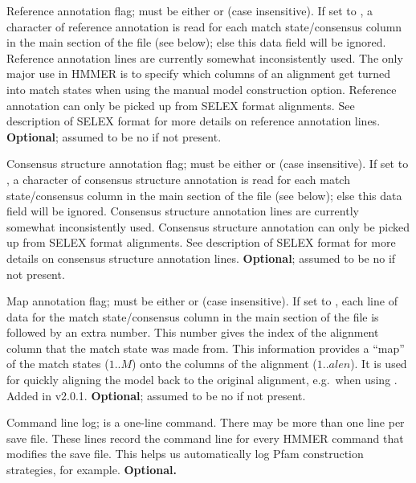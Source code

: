 \begin{wideitem}
\item [\emprog{RF    <s>}] Reference annotation flag;  must
be either  or  (case insensitive). If set to
, a character of reference annotation is read for each match
state/consensus column in the main section of the file (see below);
else this data field will be ignored.  Reference annotation lines are
currently somewhat inconsistently used. The only major use in HMMER is
to specify which columns of an alignment get turned into match states
when using the
 manual model construction option. Reference
annotation can only be picked up from SELEX format alignments. See
description of SELEX format for more details on reference annotation
lines. \textbf{Optional}; assumed to be no if not present.

\item [\emprog{CS    <s>}] Consensus structure annotation flag;
 must be either  or  (case insensitive). If set to , a character
of consensus structure annotation is read for each match
state/consensus column in the main section of the file (see below);
else this data field will be ignored. Consensus structure annotation
lines are currently somewhat inconsistently used.  Consensus structure
annotation can only be picked up from SELEX format alignments.  See
description of SELEX format for more details on consensus structure
annotation lines. \textbf{Optional}; assumed to be no if not present.

\item [\emprog{MAP   <s>}] Map annotation flag;
 must be either  or  (case insensitive).
If set to , each line of data for the match state/consensus
column in the main section of the file is followed by an extra number.
This number gives the index of the alignment column that the match
state was made from. This information provides a ``map'' of the match
states ($1..M$) onto the columns of the alignment ($1..alen$).  It is
used for quickly aligning the model back to the original alignment,
e.g.\ when using . Added in v2.0.1.
\textbf{Optional}; assumed to be no if not present.

\item [\emprog{COM   <s>}] Command line log;  is a one-line
command. There may be more than one  line per save
file. These lines record the command line for every HMMER command that
modifies the save file. This helps us automatically log Pfam
construction strategies, for example. \textbf{Optional.}


\end{wideitem}
